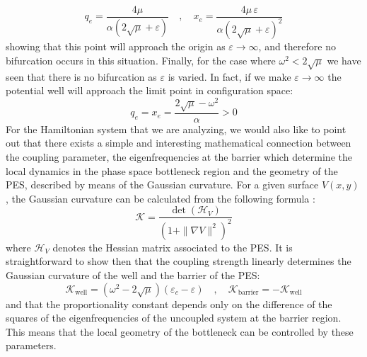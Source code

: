 \documentclass{ws-ijbc}
\begin{document}
\begin{equation}
q_e = \frac{4\mu}{\alpha(2\sqrt{\mu} + \varepsilon)} \quad,\quad x_e =  \frac{4\mu \, \varepsilon}{\alpha(2\sqrt{\mu} + \varepsilon)^2}
\end{equation}
showing that this point will approach the origin as $\varepsilon \to \infty$, and therefore no bifurcation occurs in this situation. Finally, for the case where $\omega^2 < 2\sqrt{\mu}$ we have seen that there is no bifurcation as $\varepsilon$ is varied. In fact, if we make $\varepsilon \to \infty$ the potential well will approach the limit point in configuration space:
\begin{equation}
q_e = x_e = \frac{2\sqrt{\mu} - \omega^2}{\alpha} > 0    
\end{equation}
For the Hamiltonian system that we are analyzing, we would also like to point out that there exists a simple and interesting mathematical connection between the coupling parameter, the eigenfrequencies at the barrier which determine the local dynamics in the phase space bottleneck region and the geometry of the PES, described by means of the Gaussian curvature. For a given surface $V(x,y)$, the Gaussian curvature can be calculated from the following formula \cite{spivak}:
\begin{equation}
\mathcal{K} = \dfrac{\det \left(\mathcal{H}_V\right)}{\left(1 + \| \nabla V \|^2\right)^2}
\end{equation}
where $\mathcal{H}_V$ denotes the Hessian matrix associated to the PES. It is straightforward to show then that the coupling strength linearly determines the Gaussian curvature of the well and the barrier of the PES:
\begin{equation}
\mathcal{K}_{\text{well}} = \left(\omega^2 - 2\sqrt{\mu}\right) \left(\varepsilon_c - \varepsilon\right) \quad , \quad \mathcal{K}_{\text{barrier}} = -\mathcal{K}_{\text{well}}
\end{equation}
and that the proportionality constant depends only on the difference of the squares of the eigenfrequencies of the uncoupled system at the barrier region. This means that the local geometry of the bottleneck can be controlled by these parameters.
\end{document}
